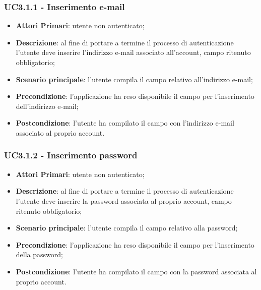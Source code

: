 \subsubsection{UC3.1.1 - Inserimento e-mail}
\begin{itemize}
	\item \textbf{Attori Primari}: utente non autenticato;
	\item \textbf{Descrizione}: al fine di portare a termine il processo di autenticazione l'utente deve inserire l'indirizzo e-mail associato all'account, campo ritenuto obbligatorio;
	\item \textbf{Scenario principale}: l'utente compila il campo relativo all'indirizzo e-mail;	
	\item \textbf{Precondizione}: l'applicazione ha reso disponibile il campo per l'inserimento dell'indirizzo e-mail;
	\item \textbf{Postcondizione}: l'utente ha compilato il campo con l'indirizzo e-mail associato al proprio account.
\end{itemize}

\subsubsection{UC3.1.2 - Inserimento password}
\begin{itemize}
	\item \textbf{Attori Primari}: utente non autenticato;
	\item \textbf{Descrizione}: al fine di portare a termine il processo di autenticazione l'utente deve inserire la password associata al proprio account, campo ritenuto obbligatorio;
	\item \textbf{Scenario principale}: l'utente compila il campo relativo alla password;	
	\item \textbf{Precondizione}: l'applicazione ha reso disponibile il campo per l'inserimento della password;
	\item \textbf{Postcondizione}: l'utente ha compilato il campo con la password associata al proprio account.
\end{itemize}


